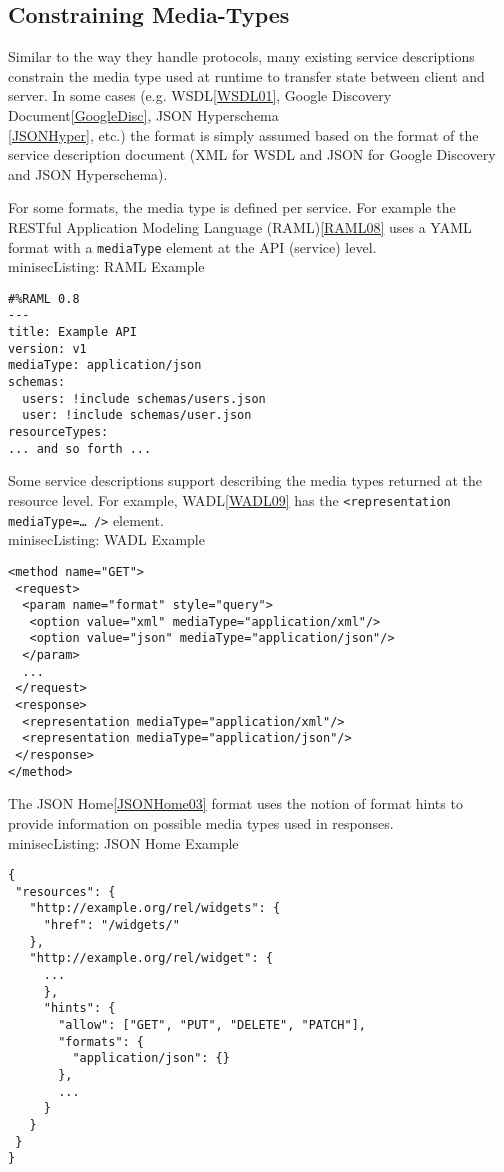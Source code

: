 \documentclass{wsrest2014}
\begin{document}
\subsection{Constraining Media-Types}
\label{_constraining_media_types}
 \par{}Similar to the way they handle protocols, many existing service descriptions constrain the media type used at runtime to transfer state between client and server. In some cases (e.g. WSDL\hyperlink{WSDL01}{[WSDL01]}, Google Discovery Document\hyperlink{GoogleDisc}{[GoogleDisc]}, JSON Hyperschema\\\hyperlink{JSONHyper}{[JSONHyper]}, etc.) the format is simply assumed based on the format of the service description document (XML for WSDL and JSON for Google Discovery and JSON Hyperschema).
 \par{}For some formats, the media type is defined per service. For example the RESTful Application Modeling Language (RAML)\hyperlink{RAML08}{[RAML08]} uses a YAML format with a \texttt{mediaType} element at the API (service) level.
\\minisec{Listing: RAML Example}
\begin{verbatim}#%RAML 0.8
---
title: Example API
version: v1
mediaType: application/json
schemas:
  users: !include schemas/users.json
  user: !include schemas/user.json
resourceTypes:
... and so forth ...\end{verbatim}

 \par{}Some service descriptions support describing the media types returned at the resource level. For example, WADL\hyperlink{WADL09}{[WADL09]} has the \texttt{\textless{}representation mediaType=\textquotedbl{}\dots{}\textquotedbl{} /\textgreater{}} element.
\\minisec{Listing: WADL Example}
\begin{verbatim}<method name="GET">
 <request>
  <param name="format" style="query">
   <option value="xml" mediaType="application/xml"/>
   <option value="json" mediaType="application/json"/>
  </param>
  ...
 </request>
 <response>
  <representation mediaType="application/xml"/>
  <representation mediaType="application/json"/>
 </response>
</method>\end{verbatim}

 \par{}The JSON Home\hyperlink{JSONHome03}{[JSONHome03]} format uses the notion of \textquotedbl{}format hints\textquotedbl{} to provide information on possible media types used in responses.
\\minisec{Listing: JSON Home Example}
\begin{verbatim}{
 "resources": {
   "http://example.org/rel/widgets": {
     "href": "/widgets/"
   },
   "http://example.org/rel/widget": {
     ...
     },
     "hints": {
       "allow": ["GET", "PUT", "DELETE", "PATCH"],
       "formats": {
         "application/json": {}
       },
       ...
     }
   }
 }
}\end{verbatim}
\end{document}
